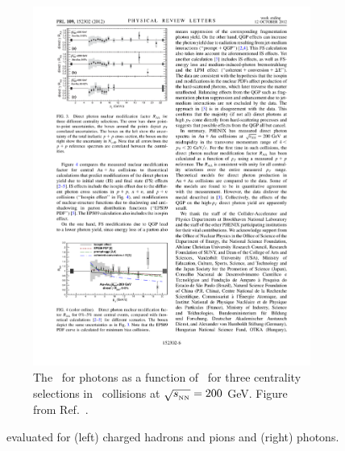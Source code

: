 \begin{figure}
\begin{subfigure}{.5\textwidth}
\includegraphics[width=\textwidth]{figures/jetMeasurements/photon_raa}
\caption{The \RAA\ for photons as a function of \pt\ for three centrality selections in \AuAu\ collisions at $\mbox{$\sqrt{s_{_\text{NN}}}$} = 200$ GeV.
Figure from Ref.~\cite{PhysRevLett.109.152302}.}
\label{fig:photon_raa}
\end{subfigure}
\caption{\RAA\ evaluated for (left) charged hadrons and pions and (right) photons.}
\label{fig:particle_raa}
\end{figure}


